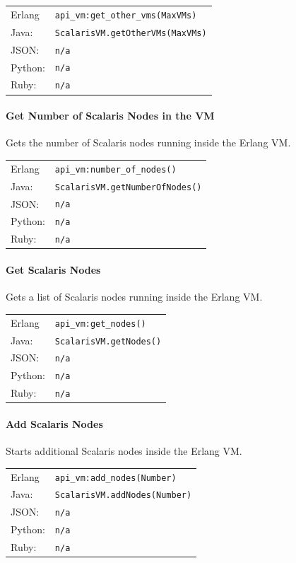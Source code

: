 \documentclass[a4paper]{scrreprt}
\newcommand{\code}[1]{\lstinline[basicstyle=\ttfamily]!#1!}
\begin{document}
\begin{tabular}{lp{14cm}}
Erlang  & \code{api_vm:get_other_vms(MaxVMs)}\\
Java:   & \code{ScalarisVM.getOtherVMs(MaxVMs)}\\
JSON:   & \code{n/a}\\
Python: & \code{n/a}\\
Ruby:   & \code{n/a}
\end{tabular}

\paragraph{Get Number of Scalaris Nodes in the VM}
Gets the number of Scalaris nodes running inside the Erlang VM.

\begin{tabular}{lp{14cm}}
Erlang  & \code{api_vm:number_of_nodes()}\\
Java:   & \code{ScalarisVM.getNumberOfNodes()}\\
JSON:   & \code{n/a}\\
Python: & \code{n/a}\\
Ruby:   & \code{n/a}
\end{tabular}

\paragraph{Get Scalaris Nodes}
Gets a list of Scalaris nodes running inside the Erlang VM.

\begin{tabular}{lp{14cm}}
Erlang  & \code{api_vm:get_nodes()}\\
Java:   & \code{ScalarisVM.getNodes()}\\
JSON:   & \code{n/a}\\
Python: & \code{n/a}\\
Ruby:   & \code{n/a}
\end{tabular}

\paragraph{Add Scalaris Nodes}
Starts additional Scalaris nodes inside the Erlang VM.

\begin{tabular}{lp{14cm}}
Erlang  & \code{api_vm:add_nodes(Number)}\\
Java:   & \code{ScalarisVM.addNodes(Number)}\\
JSON:   & \code{n/a}\\
Python: & \code{n/a}\\
Ruby:   & \code{n/a}
\end{tabular}
\end{document}
